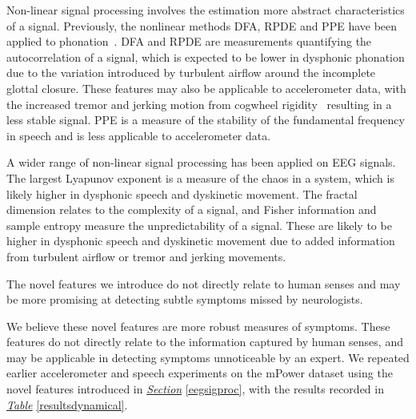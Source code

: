 \documentclass[12pt, twoside]{book}
\begin{document}
Non-linear signal processing involves the estimation more abstract characteristics of a signal. Previously, the nonlinear methods DFA, RPDE and PPE have been applied to phonation~\cite{splittlenonlinear2007,splittledysphonia2009}. DFA and RPDE are measurements quantifying the autocorrelation of a signal, which is expected to be lower in dysphonic phonation due to the variation introduced by turbulent airflow around the incomplete glottal closure. These features may also be applicable to accelerometer data, with the increased tremor and jerking motion from cogwheel rigidity~\cite{cogwheel} resulting in a less stable signal. PPE is a measure of the stability of the fundamental frequency in speech and is less applicable to accelerometer data.

A wider range of non-linear signal processing has been applied on EEG signals. The largest Lyapunov exponent is a measure of the chaos in a system, which is likely higher in dysphonic speech and dyskinetic movement. The fractal dimension relates to the complexity of a signal, and Fisher information and sample entropy measure the unpredictability of a signal. These are likely to be higher in dysphonic speech and dyskinetic movement due to added information from turbulent airflow or tremor and jerking movements. 

\begin{highlight}
The novel features we introduce do not directly relate to human senses and may be more promising at detecting subtle symptoms missed by neurologists.
\end{highlight}

We believe these novel features are more robust measures of symptoms. These features do not directly relate to the information captured by human senses, and may be applicable in detecting symptoms unnoticeable by an expert. We repeated earlier accelerometer and speech experiments on the mPower dataset using the novel features introduced in \textit{\hyperref[eegsigproc]{Section}} \ref{eegsigproc}, with the results recorded in \textit{\hyperref[resultsdynamical]{Table}} \ref{resultsdynamical}. 
\end{document}
